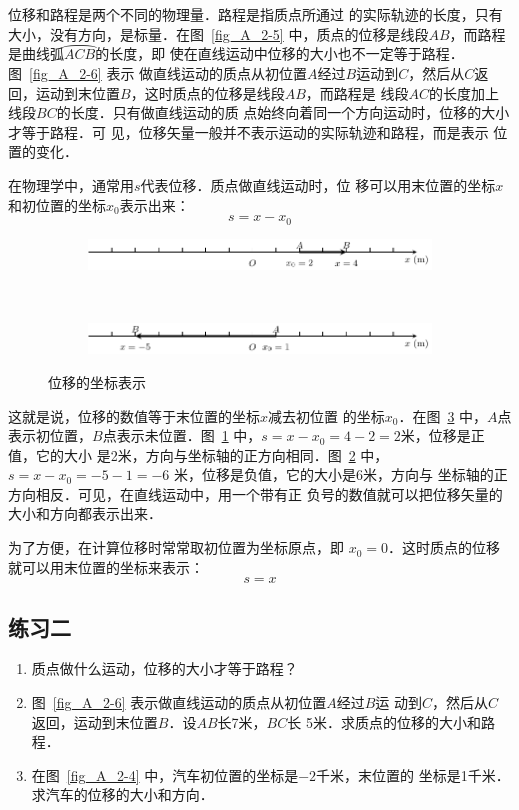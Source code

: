     位移和路程是两个不同的物理量．路程是指质点所通过
的实际轨迹的长度，只有大小，没有方向，是标量．在图~\ref{fig_A_2-5} 
中，质点的位移是线段$AB$，而路程是曲线弧$\wideparen{ACB}$的长度，即
使在直线运动中位移的大小也不一定等于路程．图~\ref{fig_A_2-6} 表示
做直线运动的质点从初位置$A$经过$B$运动到$C$，然后从$C$返
回，运动到末位置$B$，这时质点的位移是线段$AB$，而路程是
线段$AC$的长度加上线段$BC$的长度．只有做直线运动的质
点始终向着同一个方向运动时，位移的大小才等于路程．可
见，位移矢量一般并不表示运动的实际轨迹和路程，而是表示
位置的变化．

    在物理学中，通常用$s$代表位移．质点做直线运动时，位
移可以用末位置的坐标$x$和初位置的坐标$x_0$表示出来：
\[s=x-x_0\]
\begin{figure}[htp]
    \centering
    \begin{subfigure} {1\linewidth} 
		\centering
		\includegraphics{fig/A/2-7a.pdf} 
		\caption{}\label{fig_A_2-7a} 
	\end{subfigure} 
	\\
    \begin{subfigure} {1\linewidth} 
        \centering
        \includegraphics{fig/A/2-7b.pdf} 
        \caption{}\label{fig_A_2-7b} 
    \end{subfigure} 
    \caption{位移的坐标表示}\label{fig_A_2-7}
\end{figure}

这就是说，位移的数值等于末位置的坐标$x$减去初位置
的坐标$x_0$．在图~\ref{fig_A_2-7} 中，$A$点表示初位置，$B$点表示未位置．图~\ref{fig_A_2-7a}
中，$s=x-x_0=4-2=2$米，位移是正值，它的大小
是2米，方向与坐标轴的正方向相同．图~\ref{fig_A_2-7b} 中，$s=x-x_0=-5-1=-6$
米，位移是负值，它的大小是6米，方向与
坐标轴的正方向相反．可见，在直线运动中，用一个带有正
负号的数值就可以把位移矢量的大小和方向都表示出来．

    为了方便，在计算位移时常常取初位置为坐标原点，即
$x_0=0$．这时质点的位移就可以用末位置的坐标来表示：
\[s=x\]

\subsection*{练习二}
\begin{enumerate}
  \item   质点做什么运动，位移的大小才等于路程？
  \item  图~\ref{fig_A_2-6} 表示做直线运动的质点从初位置$A$经过$B$运
  动到$C$，然后从$C$返回，运动到末位置$B$．设$AB$长7米，$BC$长
  5米．求质点的位移的大小和路程．
  \item 在图~\ref{fig_A_2-4} 中，汽车初位置的坐标是$-2$千米，末位置的
  坐标是1千米．求汽车的位移的大小和方向．
  
\end{enumerate}


